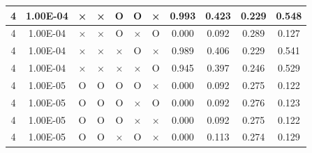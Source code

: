 \documentclass[11pt]{article}
\begin{document}
\begin{longtable}[h]{|r|r|l|l|l|l|l|r|r|l|r|}
\multicolumn{1}{|c|}{4} & \multicolumn{1}{c|}{1.00E-04} & \multicolumn{1}{c|}{×} & \multicolumn{1}{c|}{×} & \multicolumn{1}{c|}{O} & \multicolumn{1}{c|}{O} & \multicolumn{1}{c|}{×} & \multicolumn{1}{c|}{0.993} & \multicolumn{1}{c|}{0.423} & \multicolumn{1}{c|}{0.229} & \multicolumn{1}{c|}{0.548} \\ \hline
\multicolumn{1}{|c|}{4} & \multicolumn{1}{c|}{1.00E-04} & \multicolumn{1}{c|}{×} & \multicolumn{1}{c|}{×} & \multicolumn{1}{c|}{O} & \multicolumn{1}{c|}{×} & \multicolumn{1}{c|}{O} & \multicolumn{1}{c|}{0.000} & \multicolumn{1}{c|}{0.092} & \multicolumn{1}{c|}{0.289} & \multicolumn{1}{c|}{0.127} \\ \hline
\multicolumn{1}{|c|}{4} & \multicolumn{1}{c|}{1.00E-04} & \multicolumn{1}{c|}{×} & \multicolumn{1}{c|}{×} & \multicolumn{1}{c|}{×} & \multicolumn{1}{c|}{O} & \multicolumn{1}{c|}{×} & \multicolumn{1}{c|}{0.989} & \multicolumn{1}{c|}{0.406} & \multicolumn{1}{c|}{0.229} & \multicolumn{1}{c|}{0.541} \\ \hline
\multicolumn{1}{|c|}{4} & \multicolumn{1}{c|}{1.00E-04} & \multicolumn{1}{c|}{×} & \multicolumn{1}{c|}{×} & \multicolumn{1}{c|}{×} & \multicolumn{1}{c|}{×} & \multicolumn{1}{c|}{O} & \multicolumn{1}{c|}{0.945} & \multicolumn{1}{c|}{0.397} & \multicolumn{1}{c|}{0.246} & \multicolumn{1}{c|}{0.529} \\ \hline
\multicolumn{1}{|c|}{4} & \multicolumn{1}{c|}{1.00E-05} & \multicolumn{1}{c|}{O} & \multicolumn{1}{c|}{O} & \multicolumn{1}{c|}{O} & \multicolumn{1}{c|}{O} & \multicolumn{1}{c|}{×} & \multicolumn{1}{c|}{0.000} & \multicolumn{1}{c|}{0.092} & \multicolumn{1}{c|}{0.275} & \multicolumn{1}{c|}{0.122} \\ \hline
\multicolumn{1}{|c|}{4} & \multicolumn{1}{c|}{1.00E-05} & \multicolumn{1}{c|}{O} & \multicolumn{1}{c|}{O} & \multicolumn{1}{c|}{O} & \multicolumn{1}{c|}{×} & \multicolumn{1}{c|}{O} & \multicolumn{1}{c|}{0.000} & \multicolumn{1}{c|}{0.092} & \multicolumn{1}{c|}{0.276} & \multicolumn{1}{c|}{0.123} \\ \hline
\multicolumn{1}{|c|}{4} & \multicolumn{1}{c|}{1.00E-05} & \multicolumn{1}{c|}{O} & \multicolumn{1}{c|}{O} & \multicolumn{1}{c|}{O} & \multicolumn{1}{c|}{×} & \multicolumn{1}{c|}{×} & \multicolumn{1}{c|}{0.000} & \multicolumn{1}{c|}{0.092} & \multicolumn{1}{c|}{0.275} & \multicolumn{1}{c|}{0.122} \\ \hline
\multicolumn{1}{|c|}{4} & \multicolumn{1}{c|}{1.00E-05} & \multicolumn{1}{c|}{O} & \multicolumn{1}{c|}{O} & \multicolumn{1}{c|}{×} & \multicolumn{1}{c|}{O} & \multicolumn{1}{c|}{×} & \multicolumn{1}{c|}{0.000} & \multicolumn{1}{c|}{0.113} & \multicolumn{1}{c|}{0.274} & \multicolumn{1}{c|}{0.129} \\ \hline

\end{longtable}
\end{document}

